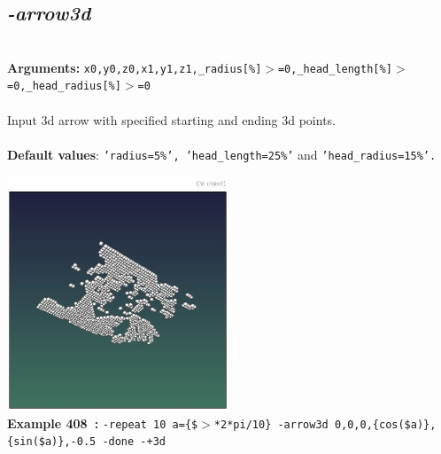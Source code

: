 \documentclass[a4paper,11pt,twoside]{book}
\begin{document}
\subsection{\emph{-arrow3d} }\vspace*{-0.5em}
~\\\textbf{Arguments: } 
{\small \texttt{x0,y0,z0,x1,y1,z1,\_radius[\%]$>$=0,\_head\_length[\%]$>$=0,\_head\_radius[\%]$>$=0}}\\~\\
Input 3d arrow with specified starting and ending 3d points.
~\\~\\\textbf{Default values}: {\small \texttt{'radius=5\%', 'head\_length=25\%'} and \texttt{'head\_radius=15\%'.}}
\begin{center}\includegraphics[keepaspectratio=true,height=7cm,width=\textwidth]{img/gmic_def408.jpg}\\
{\footnotesize \textbf{Example 408~:} \texttt{-repeat 10 a=\{\$$>$*2*pi/10\} -arrow3d 0,0,0,\{cos(\$a)\},\{sin(\$a)\},-0.5 -done -+3d}}
\end{center}
\end{document}
